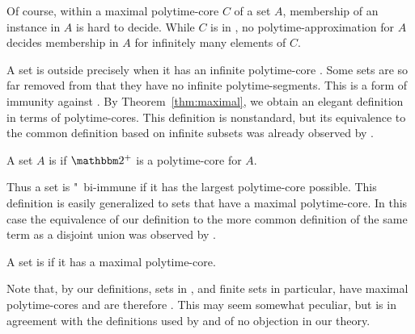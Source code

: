 Of course, within a maximal polytime-core $C$ of a set $A$, membership of an instance in $A$ is hard to decide.
While $C$ is in , no polytime-approximation for $A$ decides membership in $A$ for infinitely many elements of $C$.

A set is outside  precisely when it has an infinite polytime-core \parencite{lynch1975reducibility}.
Some sets are so far removed from  that they have no infinite polytime-segments.
This is a form of immunity against .
By Theorem~\ref{thm:maximal}, we obtain an elegant definition in terms of polytime-cores.
This definition is nonstandard, but its equivalence to the common definition based on infinite subsets was already observed by \textcite{balcazar1985bi-immune} \parencite[see also][]{book1988polynomial}.
\begin{definition}
  A set $A$ is  if $\binary^+$ is a polytime-core for $A$.
\end{definition}

Thus a set is "~bi-immune if it has the largest polytime-core possible.
This definition is easily generalized to sets that have a maximal polytime-core.
In this case the equivalence of our definition to the more common definition of the same term as a disjoint union was observed by \textcite{orponen1986classification}.
\begin{definition}
  A set is  if it has a maximal polytime-core.
\end{definition}
Note that, by our definitions, sets in , and finite sets in particular, have maximal polytime-cores and are therefore .
This may seem somewhat peculiar, but is in agreement with the definitions used by \textcite{orponen1986classification} and of no objection in our theory.

